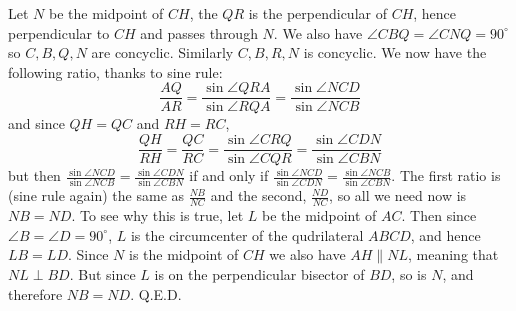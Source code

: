 \documentclass[11pt,a4paper]{article}
\begin{document}
\begin{enumerate}
	Let $N$ be the midpoint of $CH$, the $QR$ is the perpendicular of $CH$, hence perpendicular to $CH$ and passes through $N$. We also have $\angle CBQ=\angle CNQ = 90^{\circ}$ so $C, B, Q, N$ are concyclic. Similarly $C, B, R, N$ is concyclic. We now have the following ratio, thanks to sine rule: 
	\[
	\frac{AQ}{AR} = \frac{\sin\angle QRA}{\sin\angle RQA} = \frac{\sin\angle NCD}{\sin\angle NCB}
	\]
	and since $QH=QC$ and $RH=RC$, 
	\[
	\frac{QH}{RH} = \frac{QC}{RC} = \frac{\sin\angle CRQ}{\sin\angle CQR} = \frac{\sin\angle CDN}{\sin\angle CBN}
	\]
	but then $\frac{\sin\angle NCD}{\sin\angle NCB} = \frac{\sin\angle CDN}{\sin\angle CBN}$ if and only if $\frac{\sin\angle NCD}{\sin\angle CDN} = \frac{\sin\angle NCB}{\sin\angle CBN}$. The first ratio is (sine rule again) the same as $\frac{NB}{NC}$ and the second, $\frac{ND}{NC}$, so all we need now is $NB=ND$. 
	To see why this is true, let $L$ be the midpoint of $AC$. Then since $\angle B=\angle D=90^{\circ}$, $L$ is the circumcenter of the qudrilateral $ABCD$, and hence $LB=LD$. Since $N$ is the midpoint of $CH$ we also have $AH\parallel NL$, meaning that $NL\perp BD$. But since $L$ is on the perpendicular bisector of $BD$, so is $N$, and therefore $NB=ND$. Q.E.D. 
\end{enumerate}
\end{document}
